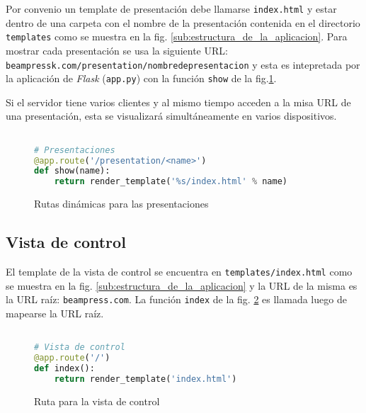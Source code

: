 			Por convenio un template de presentación debe llamarse \texttt{index.html} y estar dentro de una carpeta con el nombre de la presentación contenida en el directorio \texttt{templates} como se muestra en la fig. \ref{sub:estructura_de_la_aplicacion}. Para mostrar cada presentación se usa la siguiente URL: \\
			\texttt{beampressk.com/presentation/nombre\textendash de\textendash presentacion} y esta es intepretada por la aplicación de \textit{Flask} (\texttt{app.py}) con la función \texttt{show} de la fig.\ref{fig:presentation_routes}.

			Si el servidor tiene varios clientes y al mismo tiempo acceden a la misa URL de una presentación, esta se visualizará simultáneamente en varios dispositivos. 

			\begin{figure}[htb]%
				\begin{lstlisting}[language=Python]%

# Presentaciones
@app.route('/presentation/<name>')
def show(name):
    return render_template('%s/index.html' % name)
				\end{lstlisting}
			\caption{Rutas dinámicas para las presentaciones}
			\label{fig:presentation_routes}
			\end{figure}


		\subsection{Vista de control} %
		\label{sub:vista_de_control}
			El template de la vista de control se encuentra en \texttt{templates/index.html} como se muestra en la fig. \ref{sub:estructura_de_la_aplicacion} y la URL de la misma es la URL raíz: \texttt{beampress.com}. La función \texttt{index} de la fig. \ref{fig:control_view_code} es llamada luego de mapearse la URL raíz.

			\begin{figure}[htb]%
				\begin{lstlisting}[language=Python]%

# Vista de control
@app.route('/')
def index():
    return render_template('index.html')
				\end{lstlisting}
			\caption{Ruta para la vista de control}
			\label{fig:control_view_code}
			\end{figure}			
		

